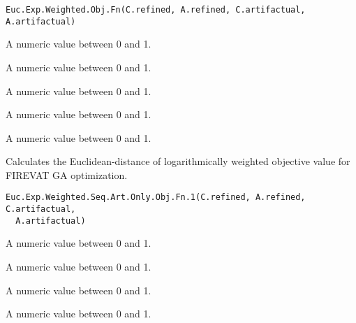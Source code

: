 \documentclass[letterpaper]{book}
\begin{document}
%
\begin{Usage}
\begin{verbatim}
Euc.Exp.Weighted.Obj.Fn(C.refined, A.refined, C.artifactual, A.artifactual)
\end{verbatim}
\end{Usage}
%
\begin{Arguments}
\begin{ldescription}
\item[\code{C.refined}] A numeric value between 0 and 1.

\item[\code{A.refined}] A numeric value between 0 and 1.

\item[\code{C.artifactual}] A numeric value between 0 and 1.

\item[\code{A.artifactual}] A numeric value between 0 and 1.
\end{ldescription}
\end{Arguments}
%
\begin{Value}
A numeric value between 0 and 1.
\end{Value}
%
\begin{Description}\relax
Calculates the Euclidean-distance of logarithmically weighted
objective value for FIREVAT GA optimization.
\end{Description}
%
\begin{Usage}
\begin{verbatim}
Euc.Exp.Weighted.Seq.Art.Only.Obj.Fn.1(C.refined, A.refined, C.artifactual,
  A.artifactual)
\end{verbatim}
\end{Usage}
%
\begin{Arguments}
\begin{ldescription}
\item[\code{C.refined}] A numeric value between 0 and 1.

\item[\code{A.refined}] A numeric value between 0 and 1.

\item[\code{C.artifactual}] A numeric value between 0 and 1.

\item[\code{A.artifactual}] A numeric value between 0 and 1.
\end{ldescription}
\end{Arguments}
\end{document}
